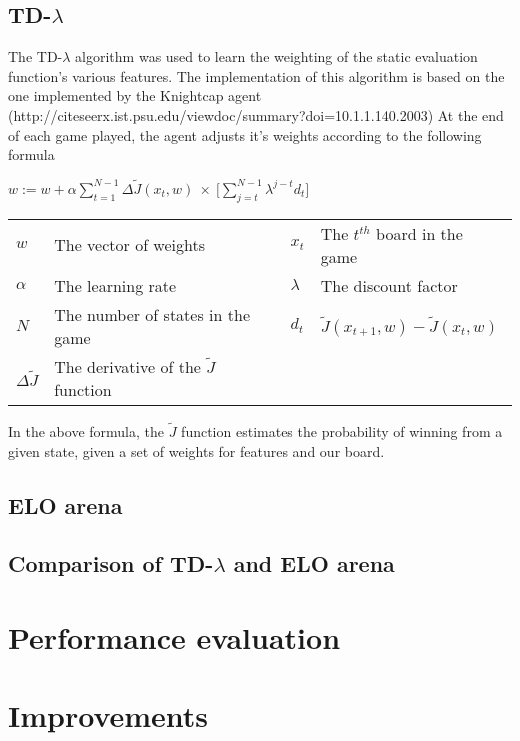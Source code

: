 \documentclass[11pt,twocolumn]{article}
\newcommand{\tdl}{TD-$\lambda$ }
\begin{document}
\subsection{\tdl}
The \tdl algorithm was used to learn the weighting of the static evaluation function's various features. The implementation of this algorithm is based on the one implemented by the Knightcap agent (http://citeseerx.ist.psu.edu/viewdoc/summary?doi=10.1.1.140.2003) %
At the end of each game played, the agent adjusts it's weights according to the following formula
\begin{center}
    $\displaystyle w := w + \alpha \sum _{t=1} ^{N-1} \Delta \tilde{J}(x_t,w) \: \times \: \Big[ \sum ^ {N-1} _{j=t} \lambda^{j-t} d_t \Big] $\\
    \begin{tabular}{  l l | l l }
      $w$                   & The vector of weights                         &$x_t$  & The $t^{th}$ board in the game \\
      $\alpha$              & The learning rate                             &$\lambda$      &The discount factor \\
      $N$                   & The number of states in the game              &$d_t$          &$\tilde{J}(x_{t+1},w) - \tilde{J}(x_t,w)$\\
      $\Delta \tilde{J}$    & The derivative of the $\tilde{J}$ function    &               &\\
    \end{tabular}
\end{center}
In the above formula, the $\tilde{J}$ function estimates the probability of winning from a given state, given a set of weights for features and our board. 
\subsection{ELO arena}
\subsection{Comparison of \tdl and ELO arena}
\section{Performance evaluation}
\section{Improvements}




\end{document}
